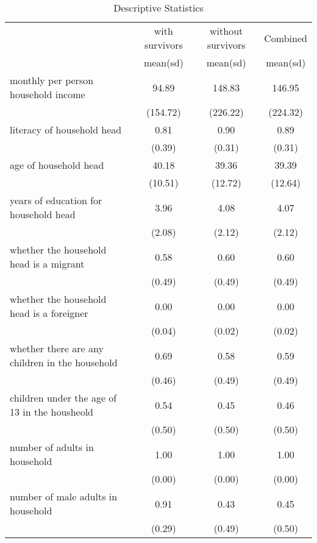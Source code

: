 \begin{table}[htbp]\centering
\def\sym#1{\ifmmode^{#1}\else\(^{#1}\)\fi}
\caption{Descriptive Statistics}
\begin{tabular}{l*{3}{c}}
\hline\hline
                    &\multicolumn{1}{c}{with survivors}&\multicolumn{1}{c}{without survivors}&\multicolumn{1}{c}{Combined}\\
                    &     mean(sd)&    mean(sd)&     mean(sd)\\
\hline
monthly per person household income&       94.89&      148.83&      146.95\\
                    &    (154.72)&    (226.22)&    (224.32)\\
literacy of household head&        0.81&        0.90&        0.89\\
                    &      (0.39)&      (0.31)&      (0.31)\\
age of household head&       40.18&       39.36&       39.39\\
                    &     (10.51)&     (12.72)&     (12.64)\\
years of education for household head&        3.96&        4.08&        4.07\\
                    &      (2.08)&      (2.12)&      (2.12)\\
whether the household head is a migrant&        0.58&        0.60&        0.60\\
                    &      (0.49)&      (0.49)&      (0.49)\\
whether the household head is a foreigner&        0.00&        0.00&        0.00\\
                    &      (0.04)&      (0.02)&      (0.02)\\
whether there are any children in the household&        0.69&        0.58&        0.59\\
                    &      (0.46)&      (0.49)&      (0.49)\\
children under the age of 13 in the housheold&        0.54&        0.45&        0.46\\
                    &      (0.50)&      (0.50)&      (0.50)\\
number of adults in household&        1.00&        1.00&        1.00\\
                    &      (0.00)&      (0.00)&      (0.00)\\
number of male adults in household&        0.91&        0.43&        0.45\\
                    &      (0.29)&      (0.49)&      (0.50)\\

\end{tabular}
\end{table}
